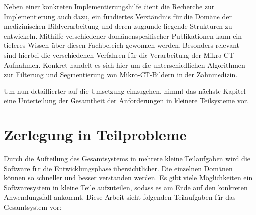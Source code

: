 Neben einer konkreten Implementierungshilfe dient die Recherche zur
Implementierung auch dazu, ein fundiertes Verständnis für die Domäne der medizinischen
Bildverarbeitung und deren zugrunde liegende Strukturen zu entwickeln. Mithilfe
verschiedener domänenspezifischer Publikationen kann ein tieferes Wissen über
diesen Fachbereich gewonnen werden. Besonders relevant sind hierbei die verschiedenen
Verfahren für die Verarbeitung der Mikro-\ac{CT}-Aufnahmen. Konkret handelt es sich
hier um die unterschiedlichen Algorithmen zur Filterung und Segmentierung von Mikro-\ac{CT}-Bildern
in der Zahnmedizin.

Um nun detaillierter auf die Umsetzung einzugehen, nimmt das nächste Kapitel eine
Unterteilung der Gesamtheit der Anforderungen in kleinere Teilsysteme vor.

\section{Zerlegung in Teilprobleme}
\label{sec_zerlegung_in_teilprobleme} Durch die Aufteilung des Gesamtsystems in mehrere
kleine Teilaufgaben wird die Software für die Entwicklungsphase übersichtlicher.
Die einzelnen Domänen können so schneller und besser verstanden werden. Es gibt viele
Möglichkeiten ein Softwaresystem in kleine Teile aufzuteilen, sodass es am Ende
auf den konkreten Anwendungsfall ankommt. Diese Arbeit sieht folgenden Teilaufgaben
für das Gesamtsystem vor:

